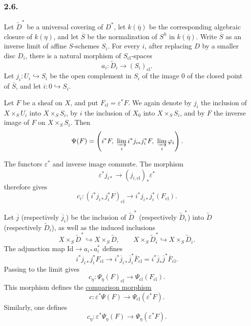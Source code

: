 \subsubsection*{2.6.}
Let $\widetilde D^*$ be a universal covering of $D^*$, let
$k(\bar\eta)$ be the corresponding algebraic closure of $k(\eta)$,
and let $\overline S$ be the normalization of $S^h$ in
$k(\bar\eta)$.  Write $\overline S$ as an inverse limit of affine
$S$-schemes $S_i$.  For every $i$, after replacing $D$ by a smaller
disc $D_i$, there is a natural morphism of $S_{\mathrm{cl}}$-spaces
\[
a_i:\widetilde D_i\longrightarrow(S_i)_{\mathrm{cl}}.
\]
Let $j_i:U_i\hookrightarrow S_i$ be the open complement in $S_i$ of
the image $0$ of the closed point of $\overline S$, and let
$i:0\hookrightarrow S_i$.

Let $F$ be a sheaf on $X$, and put $F_{\mathrm{cl}}=\varepsilon^*F$.
We again denote by $j_i$ the inclusion of $X\times_SU_i$ into
$X\times_SS_i$, by $i$ the inclusion of $X_0$ into
$X\times_SS_i$, and by $F$ the inverse image of $F$ on
$X\times_SS_i$.  Then
\[
\Psi(F)=
\left(i^*F,\ \varinjlim_i i^*j_{i*}j_i^*F,\
\varinjlim_i\varphi_i\right).
\]

The functors $\varepsilon^*$ and inverse image commute.  The morphism
\[
\varepsilon^*j_{i*}\longrightarrow(j_{i,\mathrm{cl}})_*\varepsilon^*
\]
therefore gives
\[
c_i:
(i^*j_{i*}j_i^*F)_{\mathrm{cl}}
\longrightarrow i^*j_{i*}j_i^*(F_{\mathrm{cl}}).
\]

Let $\overline j$ (respectively $\overline j_i$) be the inclusion of
$\widetilde D^*$ (respectively $\widetilde D_i^*$) into
$\widetilde D$ (respectively $\widetilde D_i$), as well as the
induced inclusions
\[
X\times_S\widetilde D^*\hookrightarrow X\times_S\widetilde D,
\qquad
X\times_S\widetilde D_i^*\hookrightarrow X\times_S\widetilde D_i.
\]
The adjunction map $\mathrm{Id}\longrightarrow a_{i*}a_i^*$ defines
\[
i^*j_{i*}j_i^*F_{\mathrm{cl}}
\longrightarrow
i^*\overline j_{i*}\overline j_i^*\overline F_{\mathrm{cl}}
=i^*\overline j_*\overline j^*\overline F_{\mathrm{cl}}.
\]
Passing to the limit gives
\[
c_\eta:\Psi_{\bar\eta}(F)_{\mathrm{cl}}
\longrightarrow\Psi_{\mathrm{cl}}(F_{\mathrm{cl}}).
\]
This morphism defines the \underline{comparison morphism}
\begin{equation}\tag{2.6.1}
c:\varepsilon^*\Psi(F)
\longrightarrow\Psi_{\mathrm{cl}}(\varepsilon^*F).
\end{equation}
Similarly, one defines
\begin{equation}\tag{2.6.2}
c_\eta:\varepsilon^*\Psi_\eta(F)
\longrightarrow\Psi_\eta(\varepsilon^*F).
\end{equation}

